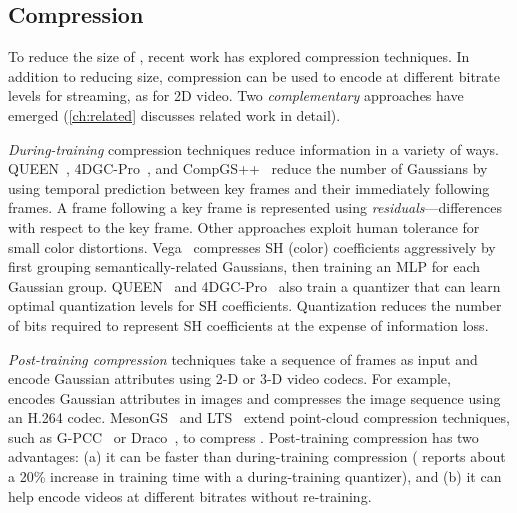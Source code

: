 \subsection{\dgs{} Compression}\label{sec:dgs-compression}

To reduce the size of \dgs{}, recent work has explored compression techniques.
%
In addition to reducing size, compression can be used to encode \dgs{} at different bitrate levels for streaming, as for 2D video.
%
Two \textit{complementary} approaches have emerged (\cref{ch:related} discusses related work in detail).

\textit{During-training} compression techniques reduce information in a variety of ways.
%
QUEEN~\cite{queen}, 4DGC-Pro~\cite{zheng20254dgcproefficienthierarchical4d}, and CompGS++~\cite{compgsplus} reduce the number of Gaussians by using temporal prediction between key frames and their immediately following frames.
%
A frame following a key frame is represented using \textit{residuals}---differences with respect to the key frame.
%
Other approaches exploit human tolerance for small color distortions.
%
Vega~\cite{Vega} compresses SH (color) coefficients aggressively by first grouping semantically-related Gaussians, then training an MLP for each Gaussian group.
%
QUEEN~\cite{queen} and 4DGC-Pro~\cite{zheng20254dgcproefficienthierarchical4d}  also train a quantizer that can learn optimal quantization levels for SH coefficients. %
%
Quantization reduces the number of bits required to represent SH coefficients at the expense of information loss.

\textit{Post-training compression} techniques take a sequence of \gs{} frames as input and encode Gaussian attributes using 2-D or 3-D video codecs.
%
For example, \vthree{}~\cite{v3volumetric} encodes Gaussian attributes in images and compresses the image sequence using an H.264 codec.
%
MesonGS~\cite{mesongs} and LTS~\cite{LTS} extend point-cloud compression techniques, such as G-PCC~\cite{gpcc} or Draco~\cite{draco}, to compress \dgs{}.
%
Post-training compression has two advantages: (a) it can be faster than during-training compression (\cite{queen} reports about a 20\% increase in training time with a during-training quantizer), and (b) it can help encode \dgs{} videos at different bitrates without re-training.



